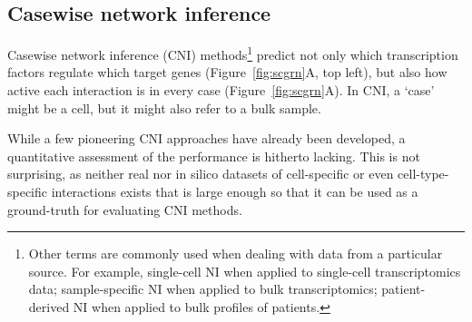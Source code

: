 \subsection{Casewise network inference}
Casewise network inference (CNI)
methods\footnote{Other terms are commonly used when dealing with data from a particular source. For example, single-cell NI when applied to single-cell transcriptomics data; sample-specific NI when applied to bulk transcriptomics; patient-derived NI when applied to bulk profiles of patients.}
predict not only which transcription factors regulate which target genes
(Figure~\ref{fig:scgrn}A, top left), but also how active each
interaction is in every case (Figure~\ref{fig:scgrn}A). In CNI, a `case'
might be a cell, but it might also refer to a bulk sample.

While a few pioneering CNI approaches have already been
developed\autocites{aibar_scenicsinglecellregulatory_2017}{kuijjer_estimatingsamplespecificregulatory_2019}{liu_personalizedcharacterizationdiseases_2016},
a quantitative assessment of the performance is hitherto lacking. This
is not surprising, as neither real nor in silico datasets of
cell-specific or even cell-type-specific interactions exists that is
large enough so that it can be used as a ground-truth for evaluating CNI
methods.


